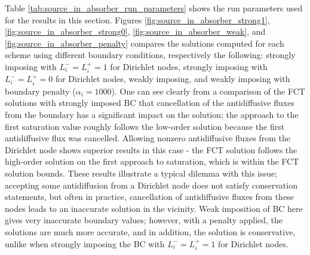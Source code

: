 Table \ref{tab:source_in_absorber_run_parameters} shows the run parameters used
for the results in this section.
Figures \ref{fig:source_in_absorber_strong1},
\ref{fig:source_in_absorber_strong0},
\ref{fig:source_in_absorber_weak}, and
\ref{fig:source_in_absorber_penalty}
compares the solutions computed for each scheme using different
boundary conditions, respectively the following:
strongly imposing with $L_i^-=L_i^+=1$ for Dirichlet nodes, 
strongly imposing with $L_i^-=L_i^+=0$ for Dirichlet nodes, 
weakly imposing, and
weakly imposing with boundary penalty ($\alpha_i = 1000$).
One can see clearly from a comparison of the FCT solutions with strongly
imposed BC that cancellation of the antidiffusive fluxes from the boundary
has a significant impact on the solution; the approach to the first saturation 
value roughly follows the low-order solution because the first antidiffusive
flux was cancelled. Allowing nonzero antidiffusive fluxes from the Dirichlet
node shows superior results in this case - the FCT solution follows the
high-order solution on the
first approach to saturation, which is within the FCT solution bounds. These
results illustrate a typical dilemma with this issue; accepting some antidiffusion
from a Dirichlet node does not satisfy conservation statements, but often
in practice, cancellation of antidiffusive fluxes from these nodes leads to
an inaccurate solution in the vicinity.
Weak imposition of BC here gives very inaccurate boundary values;
however, with a penalty applied, the solutions are much more accurate,
and in addition, the solution is conservative, unlike when strongly imposing
the BC with $L_i^-=L_i^+=1$ for Dirichlet nodes.

